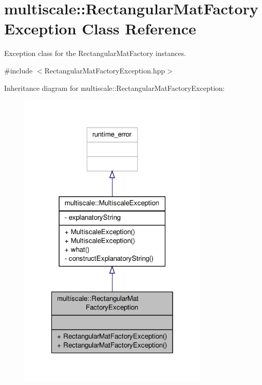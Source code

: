 \hypertarget{classmultiscale_1_1RectangularMatFactoryException}{\section{multiscale\-:\-:Rectangular\-Mat\-Factory\-Exception Class Reference}
\label{classmultiscale_1_1RectangularMatFactoryException}
}


Exception class for the Rectangular\-Mat\-Factory instances.  




{\ttfamily \#include $<$Rectangular\-Mat\-Factory\-Exception.\-hpp$>$}



Inheritance diagram for multiscale\-:\-:Rectangular\-Mat\-Factory\-Exception\-:
\nopagebreak
\begin{figure}[H]
\begin{center}
\leavevmode
\includegraphics[width=256pt]{classmultiscale_1_1RectangularMatFactoryException__inherit__graph}
\end{center}
\end{figure}


